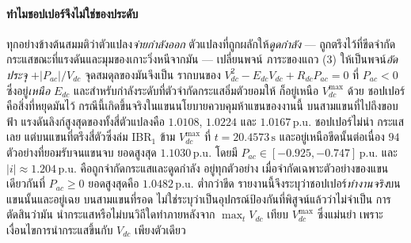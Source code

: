 \documentclass[12pt,a4paper]{article}
\newcommand{\pu}{\,\mathrm{p.u.}}
\newcommand{\second}{\,\mathrm{s}}
\begin{document}
\paragraph{ทำไมชอปเปอร์จึงไม่ใช่ของประดับ}
ทุกอย่างข้างต้นสมมติว่าตัวแปลง\emph{จ่ายกำลังออก} ตัวแปลงที่ถูกผลักให้\emph{ดูดกำลัง}
--- ถูกตรึงไว้ที่ขีดจำกัดกระแสขณะที่แรงดันและมุมของเกาะวิ่งหนีจากมัน --- เปลี่ยนพจน์
ภาระของแถว (3) ให้เป็นพจน์\emph{อัดประจุ} $+|P_{ac}|/V_{dc}$ จุดสมดุลของมันจึงเป็น
รากบนของ $V_{dc}^{2}-E_{dc}V_{dc}+R_{dc}P_{ac}=0$ ที่ $P_{ac}<0$ ซึ่งอยู่\emph{เหนือ}
$E_{dc}$ และสำหรับกำลังระดับที่ตัวจำกัดกระแสอิ่มตัวยอมให้ ก็อยู่เหนือ $V_{dc}^{\max}$
ด้วย ชอปเปอร์คือสิ่งที่หยุดมันไว้
กรณีนี้เกิดขึ้นจริงในแขนนโยบายควบคุมห้าแขนของงานนี้ บนสามแขนที่ไปถึงขอบฟ้า
แรงดันลิงก์สูงสุดของทั้งสี่ตัวแปลงคือ $1.0108$, $1.0224$ และ $1.0167\pu$ ชอปเปอร์ไม่นำ
กระแสเลย แต่บนแขนที่ตรึงสี่ตัวซึ่งล่ม IBR$_1$ ข้าม $V_{dc}^{\max}$ ที่ $t=20.4573\second$
และอยู่เหนือขีดนั้นต่อเนื่อง $94$ ตัวอย่างที่ยอมรับจนแขนจบ ยอดสูงสุด $1.1030\pu$ โดยมี
$P_{ac}\in[-0.925,-0.747]\pu$ และ $|i|\approx1.204\pu$ คือถูกจำกัดกระแสและดูดกำลัง
อยู่ทุกตัวอย่าง เมื่อจำกัดเฉพาะตัวอย่างของแขนเดียวกันที่ $P_{ac}\ge0$ ยอดสูงสุดคือ
$1.0482\pu$ ต่ำกว่าขีด รายงานนี้จึงระบุว่าชอปเปอร์\emph{ทำงานจริง}บนแขนนั้นและอยู่เฉย
บนสามแขนที่รอด ไม่ใช่ระบุว่าเป็นอุปกรณ์ป้องกันที่พิสูจน์แล้วว่าไม่จำเป็น การตัดสินว่ามัน
นำกระแสหรือไม่บนวิถีใดทำภายหลังจาก $\max_t V_{dc}$ เทียบ $V_{dc}^{\max}$ ซึ่งแม่นยำ
เพราะเงื่อนไขการนำกระแสขึ้นกับ $V_{dc}$ เพียงตัวเดียว
\end{document}
